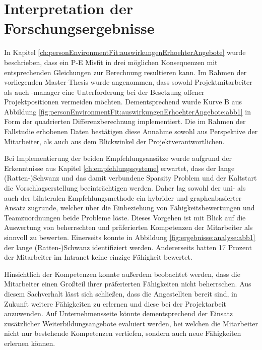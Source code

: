 \section{Interpretation der Forschungsergebnisse}
\label{ch:diskussion:interpretation}
In Kapitel \ref{ch:personEnvironmentFit:auswirkungenErhoehterAngebote} wurde beschrieben, dass ein P-E Misfit in drei möglichen Konsequenzen mit entsprechenden Gleichungen zur Berechnung resultieren kann. Im Rahmen der vorliegenden Master-Thesis wurde angenommen, dass sowohl Projektmitarbeiter als auch -manager eine Unterforderung bei der Besetzung offener Projektpositionen vermeiden möchten. Dementsprechend wurde Kurve B aus Abbildung \ref{fig:personEnvironmentFit:auswirkungenErhoehterAngebote:abb1} in Form der quadrierten Differenzberechnung implementiert. Die im Rahmen der Fallstudie erhobenen Daten bestätigen diese Annahme sowohl aus Perspektive der Mitarbeiter, als auch aus dem Blickwinkel der Projektverantwortlichen. 

Bei Implementierung der beiden Empfehlungsansätze wurde aufgrund der Erkenntnisse aus Kapitel \ref{ch:empfehlungssysteme} erwartet, dass der lange (Ratten-)Schwanz und das damit verbundene Sparsity Problem und der Kaltstart die Vorschlagserstellung beeinträchtigen werden. Daher lag sowohl der uni- als auch der bilateralen Empfehlungsmethode ein hybrider und graphenbasierter Ansatz zugrunde, welcher über die Einbeziehung von Fähigkeitsbewertungen und Teamzuordnungen beide Probleme löste. Dieses Vorgehen ist mit Blick auf die Auswertung von beherrschten und präferierten Kompetenzen der Mitarbeiter als sinnvoll zu bewerten. Einerseits konnte in Abbildung \ref{fig:ergebnisse:analyse:abb1} der lange (Ratten-)Schwanz identifiziert werden. Andererseits hatten 17 Prozent der Mitarbeiter im Intranet keine einzige Fähigkeit bewertet.%

Hinsichtlich der Kompetenzen konnte außerdem beobachtet werden, dass die Mitarbeiter einen Großteil ihrer präferierten Fähigkeiten nicht beherrschen. Aus diesem Sachverhalt lässt sich schließen, dass die Angestellten bereit sind, in Zukunft weitere Fähigkeiten zu erlernen und diese bei der Projektarbeit anzuwenden. Auf Unternehmensseite könnte dementsprechend der Einsatz zusätzlicher Weiterbildungsangebote evaluiert werden, bei welchen die Mitarbeiter nicht nur bestehende Kompetenzen vertiefen, sondern auch neue Fähigkeiten erlernen können.

